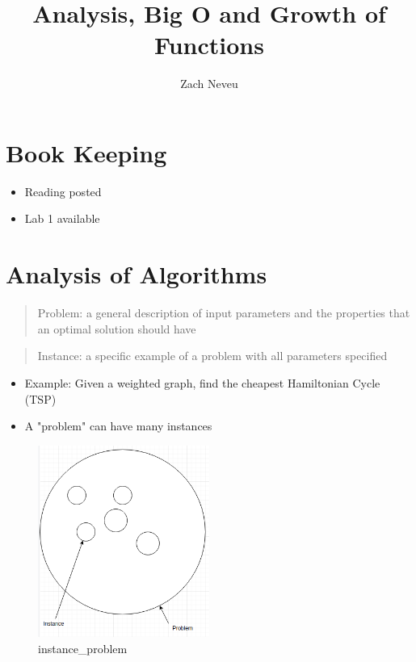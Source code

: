 \documentclass[12pt, letter]{article}
\author{Zach Neveu}
\title{ Analysis, Big O and Growth of Functions }
\begin{document}
\maketitle

\section{Book Keeping}%
\label{sec:book_keeping}
\begin{itemize}
	\item Reading posted
	\item Lab 1 available
\end{itemize}

\section{Analysis of Algorithms}%
\label{sec:analysis_of_algorithms}
\begin{quote}
	Problem: a general description of input parameters and the properties that an optimal solution should have
\end{quote}
\begin{quote}
	Instance: a specific example of a problem with all parameters specified
\end{quote}
\begin{itemize}
	\item Example: Given a weighted graph, find the cheapest Hamiltonian Cycle (TSP)
	\item A "problem" can have many instances
\end{itemize}

\begin{figure}[h]
	\centering
	\includegraphics[width=0.5\textwidth]{instance_problem.png}
	\caption{instance\_problem}
	\label{fig:instance_problem}
\end{figure}
\end{document}
